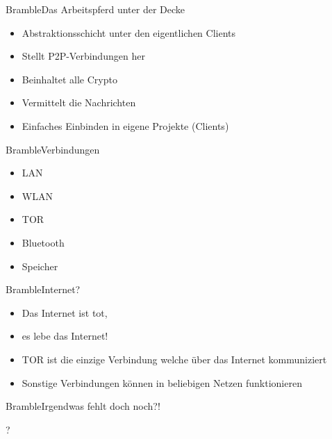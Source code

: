 
\begin{frame}{Bramble}{Das Arbeitspferd unter der Decke}
	\begin{itemize}[<+->]
	\item Abstraktionsschicht unter den eigentlichen Clients
	\item Stellt P2P-Verbindungen her
	\item Beinhaltet alle Crypto
	\item Vermittelt die Nachrichten
	\item Einfaches Einbinden in eigene Projekte (Clients)
	\end{itemize}
\end{frame}

\begin{frame}{Bramble}{Verbindungen}
	\begin{itemize}[<+->]
		\item LAN
		\item WLAN
		\item TOR
		\item Bluetooth
		\item Speicher
	\end{itemize}
\end{frame}

\begin{frame}{Bramble}{Internet?}
	\begin{itemize}[<+->]
		\item Das Internet ist tot,
		\item es lebe das Internet!
		\item TOR ist die einzige Verbindung welche über das Internet kommuniziert
		\item Sonstige Verbindungen können in beliebigen Netzen funktionieren
	\end{itemize}
\end{frame}

\begin{frame}{Bramble}{Irgendwas fehlt doch noch?!}
	\begin{center}
		\Huge ?
	\end{center}
\end{frame}
